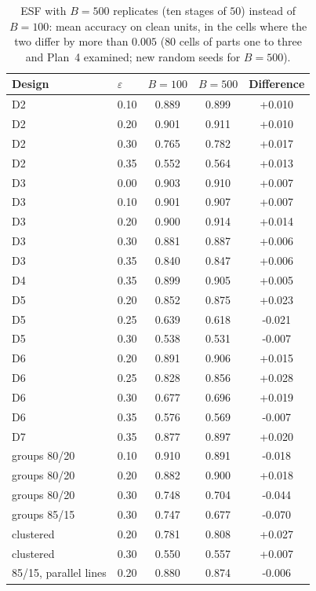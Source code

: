 \begin{table}[htbp]
\centering
\small
\caption{ESF with $B=500$ replicates (ten stages of $50$) instead of $B=100$: mean accuracy on clean units, in the cells where the two differ by more than $0.005$ ($80$ cells of parts one to three and Plan~4 examined; new random seeds for $B=500$).}
\label{tab:S29}
\begin{tabular}{llccc}
\toprule
Design & $\varepsilon$ & $B=100$ & $B=500$ & Difference \\
\midrule
D2 & 0.10 & 0.889 & 0.899 & +0.010 \\
D2 & 0.20 & 0.901 & 0.911 & +0.010 \\
D2 & 0.30 & 0.765 & 0.782 & +0.017 \\
D2 & 0.35 & 0.552 & 0.564 & +0.013 \\
D3 & 0.00 & 0.903 & 0.910 & +0.007 \\
D3 & 0.10 & 0.901 & 0.907 & +0.007 \\
D3 & 0.20 & 0.900 & 0.914 & +0.014 \\
D3 & 0.30 & 0.881 & 0.887 & +0.006 \\
D3 & 0.35 & 0.840 & 0.847 & +0.006 \\
D4 & 0.35 & 0.899 & 0.905 & +0.005 \\
D5 & 0.20 & 0.852 & 0.875 & +0.023 \\
D5 & 0.25 & 0.639 & 0.618 & -0.021 \\
D5 & 0.30 & 0.538 & 0.531 & -0.007 \\
D6 & 0.20 & 0.891 & 0.906 & +0.015 \\
D6 & 0.25 & 0.828 & 0.856 & +0.028 \\
D6 & 0.30 & 0.677 & 0.696 & +0.019 \\
D6 & 0.35 & 0.576 & 0.569 & -0.007 \\
D7 & 0.35 & 0.877 & 0.897 & +0.020 \\
groups 80/20 & 0.10 & 0.910 & 0.891 & -0.018 \\
groups 80/20 & 0.20 & 0.882 & 0.900 & +0.018 \\
groups 80/20 & 0.30 & 0.748 & 0.704 & -0.044 \\
groups 85/15 & 0.30 & 0.747 & 0.677 & -0.070 \\
clustered & 0.20 & 0.781 & 0.808 & +0.027 \\
clustered & 0.30 & 0.550 & 0.557 & +0.007 \\
85/15, parallel lines & 0.20 & 0.880 & 0.874 & -0.006 \\
\bottomrule
\end{tabular}
\end{table}